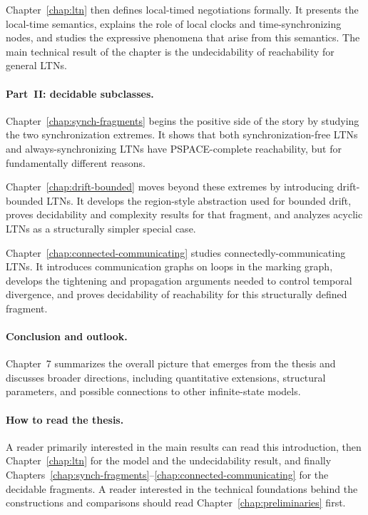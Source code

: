 Chapter~\ref{chap:ltn} then defines local-timed negotiations formally. It presents the local-time semantics, explains the role of local clocks and time-synchronizing nodes, and studies the expressive phenomena that arise from this semantics. The main technical result of the chapter is the undecidability of reachability for general LTNs.

\paragraph{Part~II: decidable subclasses.}
Chapter~\ref{chap:synch-fragments} begins the positive side of the story by studying the two synchronization extremes. It shows that both synchronization-free LTNs and always-synchronizing LTNs have PSPACE-complete reachability, but for fundamentally different reasons.

Chapter~\ref{chap:drift-bounded} moves beyond these extremes by introducing drift-bounded LTNs. It develops the region-style abstraction used for bounded drift, proves decidability and complexity results for that fragment, and analyzes acyclic LTNs as a structurally simpler special case.

Chapter~\ref{chap:connected-communicating} studies connectedly-communicating LTNs. It introduces communication graphs on loops in the marking graph, develops the tightening and propagation arguments needed to control temporal divergence, and proves decidability of reachability for this structurally defined fragment.

\paragraph{Conclusion and outlook.}
Chapter~7 summarizes the overall picture that emerges from the thesis and discusses broader directions, including quantitative extensions, structural parameters, and possible connections to other infinite-state models.

\paragraph{How to read the thesis.}
A reader primarily interested in the main results can read this introduction, then Chapter~\ref{chap:ltn} for the model and the undecidability result, and finally Chapters~\ref{chap:synch-fragments}--\ref{chap:connected-communicating} for the decidable fragments. A reader interested in the technical foundations behind the constructions and comparisons should read Chapter~\ref{chap:preliminaries} first.

